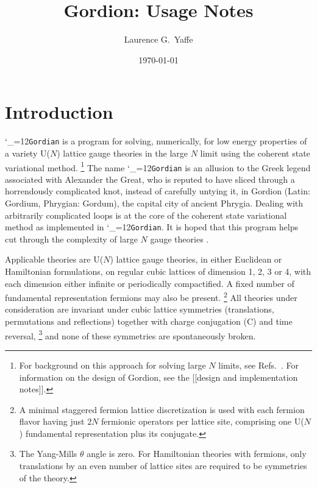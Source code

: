 \documentclass [12pt]{article}
\title
    {
    Gordion: Usage Notes
    \vspace*{-8pt}
    }
\date	{\small\today\vspace*{-30pt}}
\author	{Laurence G.~Yaffe}
\affil{%
    \small
    Department of Physics, University of Washington, Seattle WA 98195, USA
    \vspace*{-12pt}
    }%
\makeatletter
\renewcommand{\tt}{\begingroup\catcode`_=12\def\_{\string_}\tt@}
\newcommand{\tt@}[1]{\texttt{#1}\endgroup}
\makeatother
\begin{document}
\maketitle
\tableofcontents
\setlength{\parskip}{5pt plus 2pt minus 1pt}

\section {Introduction}

\tt{Gordian} is a program for solving, numerically,
for low energy properties of
a variety U($N$) lattice gauge theories in the large $N$ limit using the
coherent state variational method.%
\footnote
    {%
    For background on this approach for solving large $N$ limits,
    see Refs.~\cite{YaffeRMP, CSVAI, CSVAII,Yaffe:2026ouz}.
    For information on the design of Gordion,
    see the [[design and implementation notes]].
    }
The name \tt{Gordian} is an allusion to the Greek legend
associated with Alexander the Great, who
is reputed to have sliced through a horrendously complicated
knot, instead of carefully untying it,
in Gordion (Latin: Gordium, Phrygian: Gordum),
the capital city of ancient Phrygia.
Dealing with arbitrarily complicated loops is at the
core of the coherent state variational method as
implemented in \tt{Gordian}.
It is hoped that this program helps cut through
the complexity of large $N$ gauge theories
{\large\smiley{}}.

Applicable theories are U($N$) lattice gauge theories,
in either Euclidean or Hamiltonian formulations,
on regular cubic lattices of dimension 1, 2, 3 or 4, with each
dimension either infinite or periodically compactified.
A fixed number of fundamental representation fermions
may also be present.%
\footnote
    {%
    A minimal staggered fermion lattice discretization
    is used with each fermion flavor having
    just $2N$ fermionic operators per lattice site,
    comprising one U($N$) fundamental representation
    plus its conjugate.
    }
All theories under consideration are invariant under cubic
lattice symmetries (translations, permutations and reflections)
together with charge conjugation (C) and time reversal,%
\footnote
    {%
    The Yang-Mills $\theta$ angle is zero.
    For Hamiltonian theories with fermions,
    only translations by an even number of lattice sites are
    required to be symmetries of the theory.
    }
and none of these symmetries are spontaneously broken.

\setlength{\parskip}{3pt}
\end{document}
